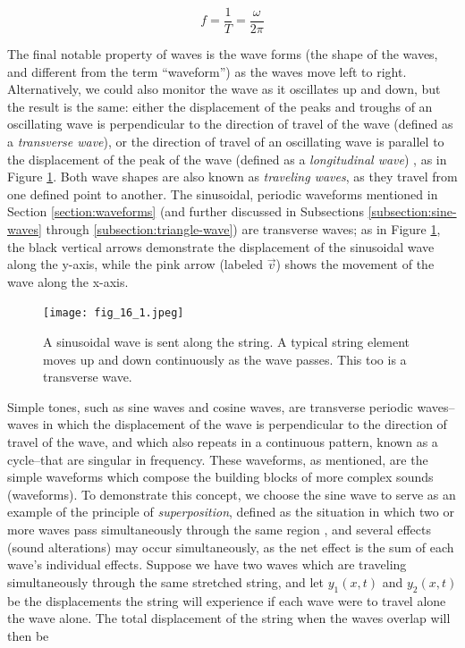 \begin{equation}
	f = \frac{1}{T} = \frac{\omega}{2\pi}
	\label{eq:physics-freq-eq}
\end{equation}

The final notable property of waves is the wave forms (the shape of the waves, and different from the term ``waveform'') as the waves move left to right. Alternatively, we could also monitor the wave as it oscillates up and down, but the result is the same: either the displacement of the peaks and troughs of an oscillating wave is perpendicular to the direction of travel of the wave (defined as a \textit{transverse wave}), or the direction of travel of an oscillating wave is parallel to the displacement of the peak of the wave (defined as a \textit{longitudinal wave}) \cite{Halliday_Resnick_Walker_2005}, as in Figure \ref{fig:transverse-wave-longitudinal-wave}. Both wave shapes are also known as \textit{traveling waves}, as they travel from one defined point to another. The sinusoidal, periodic waveforms mentioned in Section \ref{section:waveforms} (and further discussed in Subsections \ref{subsection:sine-waves} through \ref{subsection:triangle-wave}) are transverse waves; as in Figure \ref{fig:transverse-wave-longitudinal-wave}, the black vertical arrows demonstrate the displacement of the sinusoidal wave along the y-axis, while the pink arrow (labeled $\Vec{v}$) shows the movement of the wave along the x-axis.

\begin{figure}[ht]
  \centering
  \texttt{[image: fig\_16\_1.jpeg]}
  \caption{A sinusoidal wave is sent along the string. A typical string element moves up and down continuously as the wave passes. This too is a transverse wave.} \cite{Halliday_Resnick_Walker_2005}
  \label{fig:transverse-wave-longitudinal-wave}
\end{figure}

Simple tones, such as sine waves and cosine waves, are transverse periodic waves--waves in which the displacement of the wave is perpendicular to the direction of travel of the wave, and which also repeats in a continuous pattern, known as a cycle--that are singular in frequency. These waveforms, as mentioned, are the simple waveforms which compose the building blocks of more complex sounds (waveforms). To demonstrate this concept, we choose the sine wave to serve as an example of the principle of \textit{superposition}, defined as the situation in which two or more waves pass simultaneously through the same region \cite{Halliday_Resnick_Walker_2005}, and several effects (sound alterations) may occur simultaneously, as the net effect is the sum of each wave's individual effects. Suppose we have two waves which are traveling simultaneously through the same stretched string, and let $y_1(x, t)$ and $y_2(x, t)$ be the displacements the string will experience if each wave were to travel alone the wave alone. The total displacement of the string when the waves overlap will then be

